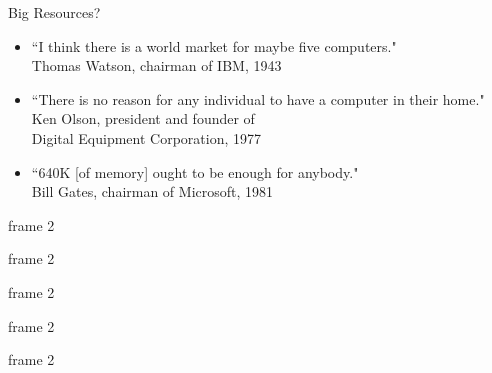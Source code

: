 \documentclass[xcolor=x11names,compress]{beamer}
\renewcommand{\(}{\begin{columns}}
\renewcommand{\)}{\end{columns}}
\newcommand{\<}[1]{\begin{column}{#1}}
\renewcommand{\>}{\end{column}}
\begin{document}
\begin{frame}{Big Resources?}
\begin{itemize}
\item ``I think there is a world market for maybe five computers."\\
\hspace*{0.5 in}Thomas Watson, chairman of IBM, 1943
\item ``There is no reason for any individual to have a computer in their home."\\
\hspace*{0.5 in}Ken Olson, president and founder of \\
\hspace*{0.5 in}Digital Equipment Corporation, 1977
\item ``640K [of memory] ought to be enough for anybody."\\
\hspace*{0.5 in}Bill Gates, chairman of Microsoft, 1981
\end{itemize}
\end{frame}

\begin{frame}{frame 2}

\end{frame}

\begin{frame}{frame 2}

\end{frame}

\begin{frame}{frame 2}

\end{frame}

\begin{frame}{frame 2}

\end{frame}

\begin{frame}{frame 2}

\end{frame}
\end{document}
